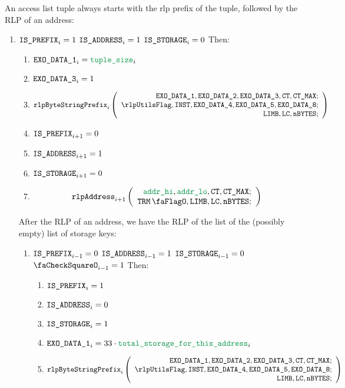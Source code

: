 An access list tuple always starts with the rlp prefix of the tuple, followed by the RLP of an address:
\begin{enumerate}[resume]
	\item \If $\texttt{IS\_PREFIX}_{i} = 1$ \et $\texttt{IS\_ADDRESS}_{i} = 1$ \et $\texttt{IS\_STORAGE}_{i} = 0$ Then:
		\begin{enumerate}
			\item $\exoDataColumn{1}_{i} = \locAccessListTupleSize_{i}$
			\item $\texttt{EXO\_DATA\_3}_{i} = 1$
			\item
				\[
					\rlpBytestringPrefix_{i}
					\left(
					\begin{array}{r}
						\exoDataColumn{1},
						\exoDataColumn{2},
						\exoDataColumn{3},
						\ct,
						\maxCt; \\
						\rlpUtilsFlag,
						\INST,
						\exoDataColumn{4},
						\exoDataColumn{5},
						\exoDataColumn{8}; \\
						\limb,
						\lc,
						\limbsize; \\
					\end{array}
					\right)
				\]
			\item $\texttt{IS\_PREFIX} _{i+1} = 0$
			\item $\texttt{IS\_ADDRESS}   _{i+1} = 1$
			\item $\texttt{IS\_STORAGE}    _{i+1} = 0$
			\item
				\[
					\rlpAddress_{i+1}
					\left(
					\begin{array}{r}
						\locAddressHi,
						\locAddressLo,
						\ct,
						\maxCt; \\
						\trmFlag,
						\limb,
						\lc,
						\limbsize; \\
					\end{array}
					\right)
				\]
		\end{enumerate}

		After the RLP of an address, we have the RLP of the list of the (possibly empty) list of storage keys:
		\begin{enumerate}[resume]
			\item \If $\texttt{IS\_PREFIX}_{i-1} = 0$ \et $\texttt{IS\_ADDRESS}_{i-1} = 1$ \et $\texttt{IS\_STORAGE}_{i-1} = 0$ \et $\done_{i-1} =1$ Then:
				\begin{enumerate}
					\item $\texttt{IS\_PREFIX} _{i} = 1$
					\item $\texttt{IS\_ADDRESS}   _{i} = 0$
					\item $\texttt{IS\_STORAGE}    _{i} = 1$
					\item $\exoDataColumn{1}_{i} = 33 \cdot \locTotStorageForThisAddress_{i}$
					\item
						\[
							\rlpBytestringPrefix_{i}
							\left(
							\begin{array}{r}
								\exoDataColumn{1},
								\exoDataColumn{2},
								\exoDataColumn{3},
								\ct,
								\maxCt; \\
								\rlpUtilsFlag,
								\INST,
								\exoDataColumn{4},
								\exoDataColumn{5},
								\exoDataColumn{8}; \\
								\limb,
								\lc,
								\limbsize; \\
							\end{array}
							\right)
						\]


\end{enumerate}
\end{enumerate}
\end{enumerate}
